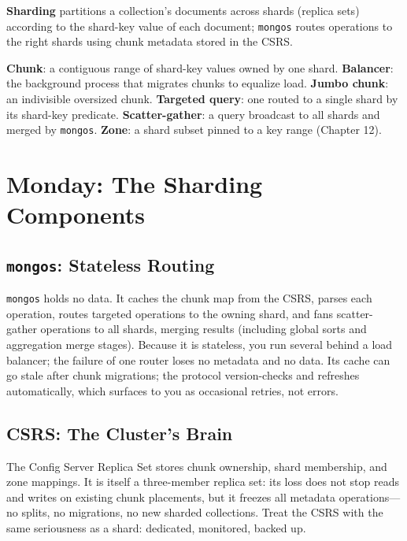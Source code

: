 \begin{definitionbox}
\textbf{Sharding} partitions a collection's documents across shards (replica sets) according to the shard-key value of each document; \texttt{mongos} routes operations to the right shards using chunk metadata stored in the CSRS.
\end{definitionbox}

\begin{keyterms}
\textbf{Chunk}: a contiguous range of shard-key values owned by one shard. \textbf{Balancer}: the background process that migrates chunks to equalize load. \textbf{Jumbo chunk}: an indivisible oversized chunk. \textbf{Targeted query}: one routed to a single shard by its shard-key predicate. \textbf{Scatter-gather}: a query broadcast to all shards and merged by \texttt{mongos}. \textbf{Zone}: a shard subset pinned to a key range (Chapter 12).
\end{keyterms}

\section{Monday: The Sharding Components}
\subsection{\texttt{mongos}: Stateless Routing}
\texttt{mongos} holds no data. It caches the chunk map from the CSRS, parses each operation, routes targeted operations to the owning shard, and fans scatter-gather operations to all shards, merging results (including global sorts and aggregation merge stages). Because it is stateless, you run several behind a load balancer; the failure of one router loses no metadata and no data. Its cache can go stale after chunk migrations; the protocol version-checks and refreshes automatically, which surfaces to you as occasional retries, not errors.

\subsection{CSRS: The Cluster's Brain}
The Config Server Replica Set stores chunk ownership, shard membership, and zone mappings. It is itself a three-member replica set: its loss does not stop reads and writes on existing chunk placements, but it freezes all metadata operations---no splits, no migrations, no new sharded collections. Treat the CSRS with the same seriousness as a shard: dedicated, monitored, backed up.


